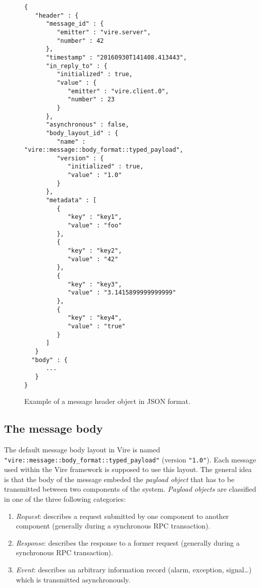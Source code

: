 \begin{figure}[h]
\vskip 10pt
\small
\begin{Verbatim}[frame=single,xleftmargin=0.cm,label=\fbox{JSON}]
{
   "header" : {
      "message_id" : {
         "emitter" : "vire.server",
         "number" : 42
      },
      "timestamp" : "20160930T141408.413443",
      "in_reply_to" : {
         "initialized" : true,
         "value" : {
            "emitter" : "vire.client.0",
            "number" : 23
         }
      },
      "asynchronous" : false,
      "body_layout_id" : {
         "name" : "vire::message::body_format::typed_payload",
         "version" : {
            "initialized" : true,
            "value" : "1.0"
         }
      },
      "metadata" : [
         {
            "key" : "key1",
            "value" : "foo"
         },
         {
            "key" : "key2",
            "value" : "42"
         },
         {
            "key" : "key3",
            "value" : "3.1415899999999999"
         },
         {
            "key" : "key4",
            "value" : "true"
         }
      ]
   }
  "body" : {
      ...
   }
}
\end{Verbatim}
\normalsize
\caption{Example of  a   message  header  object in JSON format.}
\label{fig-vire-message-message_header-json}
\end{figure}

\vfill
\clearpage
\pagebreak

\subsection{The message body}

The    default    message   body    layout    in    Vire   is    named
\texttt{"vire::message::body\_format::typed\_payload"}        (version
\texttt{"1.0"}).   Each  message used  within  the  Vire framework  is
supposed to use this layout.  The general idea is that the body of the
message embeded the  \emph{payload object} that has  to be transmitted
between  two components  of  the system.   \emph{Payload objects}  are
classified in one of the three following categories:

\begin{enumerate}

\item \emph{Request}:  describes a request submitted  by one component
  to another component (generally during a synchronous RPC transaction).

\item  \emph{Response}: describes  the  response to  a former  request
  (generally during a synchronous RPC transaction).

\item \emph{Event}: describes an  arbitrary information record (alarm,
  exception, signal\dots) which is transmitted asynchronously.

\end{enumerate}

